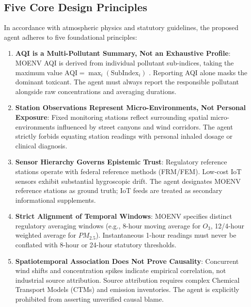 \documentclass[conference]{IEEEtran}
\begin{document}
\subsection{Five Core Design Principles}
In accordance with atmospheric physics and statutory guidelines, the proposed agent adheres to five foundational principles:
\begin{enumerate}
    \item \textbf{AQI is a Multi-Pollutant Summary, Not an Exhaustive Profile}: MOENV AQI is derived from individual pollutant sub-indices, taking the maximum value $\text{AQI} = \max_i (\text{SubIndex}_i)$ \cite{moenv2026aqi_def}. Reporting AQI alone masks the dominant toxicant. The agent must always report the responsible pollutant alongside raw concentrations and averaging durations.
    \item \textbf{Station Observations Represent Micro-Environments, Not Personal Exposure}: Fixed monitoring stations reflect surrounding spatial micro-environments influenced by street canyons and wind corridors. The agent strictly forbids equating station readings with personal inhaled dosage or clinical diagnosis.
    \item \textbf{Sensor Hierarchy Governs Epistemic Trust}: Regulatory reference stations operate with federal reference methods (FRM/FEM). Low-cost IoT sensors exhibit substantial hygroscopic drift. The agent designates MOENV reference stations as ground truth; IoT feeds are treated as secondary informational supplements.
    \item \textbf{Strict Alignment of Temporal Windows}: MOENV specifies distinct regulatory averaging windows (e.g., 8-hour moving average for $O_3$, 12/4-hour weighted average for $PM_{2.5}$). Instantaneous 1-hour readings must never be conflated with 8-hour or 24-hour statutory thresholds.
    \item \textbf{Spatiotemporal Association Does Not Prove Causality}: Concurrent wind shifts and concentration spikes indicate empirical correlation, not industrial source attribution. Source attribution requires complex Chemical Transport Models (CTMs) and emission inventories. The agent is explicitly prohibited from asserting unverified causal blame.
\end{enumerate}
\end{document}
